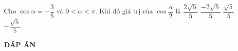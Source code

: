 \begin{ex}%
Cho $\cos\alpha =-\dfrac{3}{5}$ và $0<\alpha <\pi$. Khi đó giá trị của $\cos\dfrac{\alpha}{2}$ là
\choice
{$\dfrac{2\sqrt{5}}{5}$}
{$\dfrac{-2\sqrt{5}}{5}$}
{\True $\dfrac{\sqrt{5}}{5}$}
{$-\dfrac{\sqrt{5}}{5}$}
\end{ex}
\newpage
\begin{center}
	\textbf{ĐÁP ÁN}
\end{center}
\begin{multicols}{10}
	 
\end{multicols}
